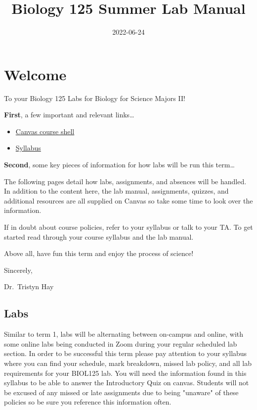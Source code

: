 \documentclass[
]{book}
\title{Biology 125 Summer Lab Manual}
\author{}
\date{\vspace{-2.5em}2022-06-24}
\providecommand{\tightlist}{%
  \setlength{\itemsep}{0pt}\setlength{\parskip}{0pt}}
\begin{document}
\maketitle

{
\setcounter{tocdepth}{1}
\tableofcontents
}
\hypertarget{welcome}{%
\chapter*{Welcome}\label{welcome}}

To your Biology 125 Labs for Biology for Science Majors II!

\textbf{First}, a few important and relevant links\ldots{}

\begin{itemize}
\tightlist
\item
  \href{https://canvas.ubc.ca/courses/94573}{Canvas course shell}
\item
  \href{https://canvas.ubc.ca/courses/94573/files/20871008}{Syllabus}
\end{itemize}

\textbf{Second}, some key pieces of information for how labs will be run this term\ldots{}

The following pages detail how labs, assignments, and absences will be handled. In addition to the content here, the lab manual, assignments, quizzes, and additional resources are all supplied on Canvas so take some time to look over the information.

If in doubt about course policies, refer to your syllabus or talk to your TA. To get started read through your course syllabus and the lab manual.

Above all, have fun this term and enjoy the process of science!

Sincerely,

Dr.~Tristyn Hay

\hypertarget{labs}{%
\section*{Labs}\label{labs}}

Similar to term 1, labs will be alternating between on-campus and online, with some online labs being conducted in Zoom during your regular scheduled lab section. In order to be successful this term please pay attention to your syllabus where you can find your schedule, mark breakdown, missed lab policy, and all lab requirements for your BIOL125 lab. You will need the information found in this syllabus to be able to answer the Introductory Quiz on canvas. Students will not be excused of any missed or late assignments due to being "unaware" of these policies so be sure you reference this information often.
\end{document}
